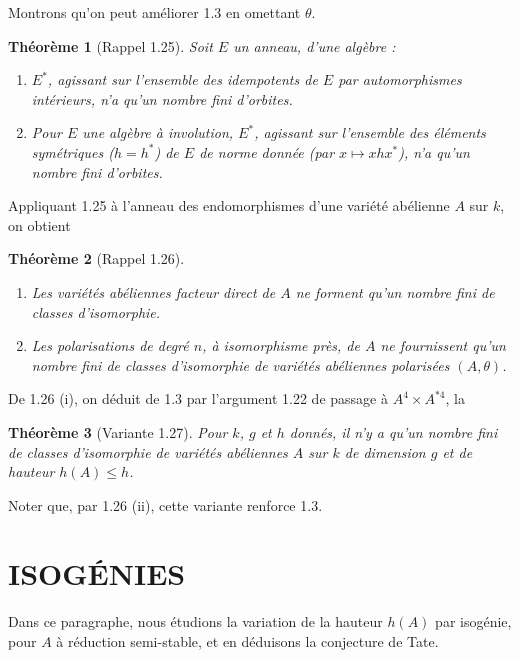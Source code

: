 \documentclass[12pt,a4paper]{article}
\theoremstyle{plain}
\newtheorem{theorem}{Théorème}[section]
\theoremstyle{definition}
\theoremstyle{remark}
\begin{document}
Montrons qu'on peut améliorer 1.3 en omettant $\theta$.

\begin{theorem}[Rappel 1.25]
Soit $E$ un anneau, d'une algèbre :
\begin{enumerate}[label=(\roman*)]
\item $E^*$, agissant sur l'ensemble des idempotents de $E$ par automorphismes intérieurs, n'a qu'un nombre fini d'orbites.
\item Pour $E$ une algèbre à involution, $E^*$, agissant sur l'ensemble des éléments symétriques ($h = h^*$) de $E$ de norme donnée (par $x \mapsto xhx^*$), n'a qu'un nombre fini d'orbites.
\end{enumerate}
\end{theorem}

Appliquant 1.25 à l'anneau des endomorphismes d'une variété abélienne $A$ sur $k$, on obtient

\begin{theorem}[Rappel 1.26]
\begin{enumerate}[label=(\roman*)]
\item Les variétés abéliennes facteur direct de $A$ ne forment qu'un nombre fini de classes d'isomorphie.
\item Les polarisations de degré $n$, à isomorphisme près, de $A$ ne fournissent qu'un nombre fini de classes d'isomorphie de variétés abéliennes polarisées $(A,\theta)$.
\end{enumerate}
\end{theorem}

De 1.26 (i), on déduit de 1.3 par l'argument 1.22 de passage à $A^4 \times A^{*4}$, la

\begin{theorem}[Variante 1.27]
Pour $k$, $g$ et $h$ donnés, il n'y a qu'un nombre fini de classes d'isomorphie de variétés abéliennes $A$ sur $k$ de dimension $g$ et de hauteur $h(A) \leq h$.
\end{theorem}

Noter que, par 1.26 (ii), cette variante renforce 1.3.


\section{ISOGÉNIES}

Dans ce paragraphe, nous étudions la variation de la hauteur $h(A)$ par isogénie, pour $A$ à réduction semi-stable, et en déduisons la conjecture de Tate.

\subsection{}
\end{document}
